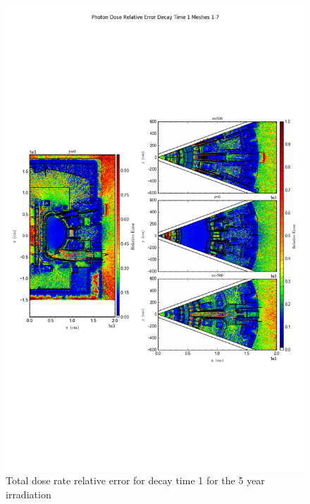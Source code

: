 \documentclass[12pt]{article}
\begin{document}
\begin{figure}[ht!]
\centering
\includegraphics[trim={0cm 8cm, 0cm 8cm},clip,scale=0.75]{../plots/final_model_with_b4c/5year/Photon_Dose_Relative_Error_Decay_Time_1_Meshes_1-7.png}
\caption{Total dose rate relative error for decay time 1 for the 5 year irradiation}
\label{fig:photons_5y_dc1_b4c_relerr}
\end{figure}
\clearpage
\end{document}
